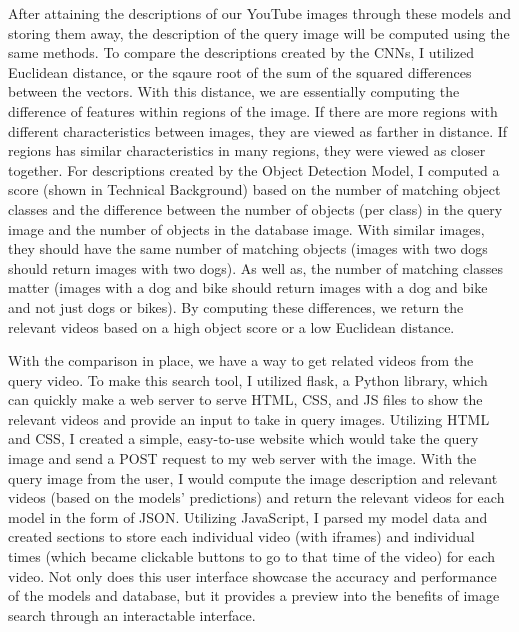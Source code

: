 \documentclass[10pt,twocolumn]{article}
\begin{document}
After attaining the descriptions of our YouTube images through these models and storing them away, the description of the query image will be computed using the same methods. To compare the descriptions created by the CNNs, I utilized Euclidean distance, or the sqaure root of the sum of the squared differences between the vectors. With this distance, we are essentially computing the difference of features within regions of the image. If there are more regions with different characteristics between images, they are viewed as farther in distance. If regions has similar characteristics in many regions, they were viewed as closer together. For descriptions created by the Object Detection Model, I computed a score (shown in Technical Background) based on the number of matching object classes and the difference between the number of objects (per class) in the query image and the number of objects in the database image. With similar images, they should have the same number of matching objects (images with two dogs should return images with two dogs). As well as, the number of matching classes matter (images with a dog and bike should return images with a dog and bike and not just dogs or bikes). By computing these differences, we return the relevant videos based on a high object score or a low Euclidean distance. 



With the comparison in place, we have a way to get related videos from the query video. To make this search tool, I utilized flask, a Python library, which can quickly make a web server to serve HTML, CSS, and JS files to show the relevant videos and provide an input to take in query images. Utilizing HTML and CSS, I created a simple, easy-to-use website which would take the query image and send a POST request to my web server with the image. With the query image from the user, I would compute the image description and relevant videos (based on the models' predictions) and return the relevant videos for each model in the form of JSON. Utilizing JavaScript, I parsed my model data and created sections to store each individual video (with iframes) and individual times (which became clickable buttons to go to that time of the video) for each video. Not only does this user interface showcase the accuracy and performance of the models and database, but it provides a preview into the benefits of image search through an interactable interface.
\end{document}
